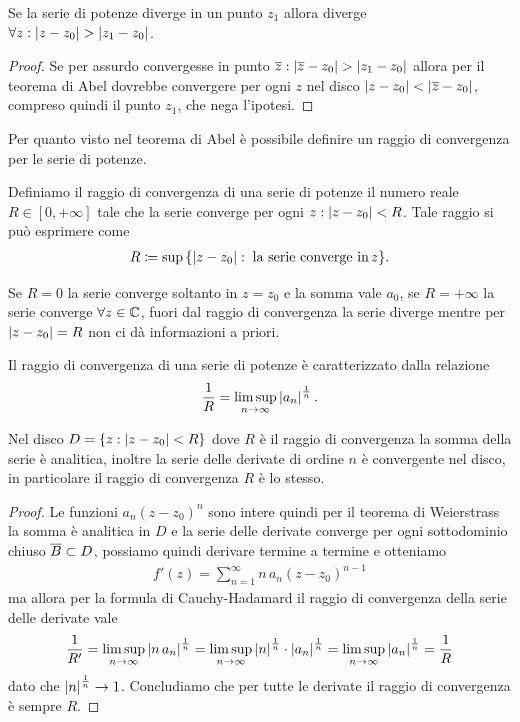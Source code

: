 \begin{lemma}[  ]
  Se la serie di potenze diverge in un punto $ z_1 $ allora diverge $ \forall z: \left|{z - z_0}\right| > \left|{z_1 - z_0}\right| $.
\end{lemma}
\begin{proof}
  Se per assurdo convergesse in punto $ \overline{z} : \left|{\overline{z} - z_0}\right| > \left|{z_1 - z_0}\right| $ allora per il teorema di Abel dovrebbe convergere per ogni 
  $ z $ nel disco $ \left|{z - z_0}\right| < \left|{\overline{z} - z_0}\right| $, compreso quindi il punto $ z_1 $, che nega l'ipotesi.
\end{proof}
Per quanto visto nel teorema di Abel è possibile definire un raggio di convergenza per le serie di potenze.
\begin{definition}
  Definiamo il raggio di convergenza di una serie di potenze il numero reale $ R \in [0, +\infty] $ tale che la serie converge per ogni 
  $ z: \left|{z - z_0}\right| < R $. Tale raggio si può esprimere come 
  \begin{align}
    R \coloneq \sup \,\{ \left|{z - z_0}\right| : \;\textnormal{la serie converge in} \,z\}.
  \end{align}
\end{definition}
Se $ R = 0 $ la serie converge soltanto in $ z = z_0 $ e la somma vale $ a_0 $, se $ R = +\infty $ la serie converge $ \forall z \in \mathbb{C} $, fuori dal raggio 
di convergenza la serie diverge mentre per $ \left|{z - z_0}\right| = R $ non ci dà informazioni a priori.
\begin{theorem}
  Il raggio di convergenza di una serie di potenze è caratterizzato dalla relazione
  \begin{align}
    \frac1R = \limsup_{n \to \infty} \left|{a_n}\right|^{\frac1n}.
  \end{align}
\end{theorem}

\begin{theorem}[  ]
  Nel disco $ D = \{ z: \left|{z - z_0}\right| < R\} $ dove $ R $ è il raggio di convergenza la somma della serie è analitica, inoltre la serie delle 
  derivate di ordine $ n $ è convergente nel disco, in particolare il raggio di convergenza $ R $ è lo stesso.
\end{theorem}
\begin{proof}
  Le funzioni $ a_n (z - z_0)^n $ sono intere quindi per il teorema di Weierstrass la somma è analitica in $ D $ e la serie delle derivate converge 
  per ogni sottodominio chiuso $ \overline{B} \subset D $, possiamo quindi derivare termine a termine e otteniamo
  \begin{align}
    f'(z) = \sum_{n = 1}^\infty n \,a_n (z - z_0)^{n -1}
  \end{align}
  ma allora per la formula di Cauchy-Hadamard il raggio di convergenza della serie delle derivate vale
  \begin{align}
    \frac1{R'} = \limsup_{n\to\infty} \left|{n \,a_n}\right|^{\frac1n} = \limsup_{n\to\infty} \left|{n}\right|^{\frac1n} \cdot \left|{a_n}\right|^{\frac1n} 
    = \limsup_{n\to\infty} \left|{a_n}\right|^{\frac1n} = \frac1R
  \end{align}
  dato che $ \left|{n}\right|^{\frac1n} \to 1 $. Concludiamo che per tutte le derivate il raggio di convergenza è sempre $ R $.
\end{proof}

